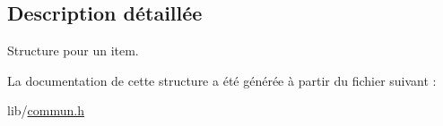 \subsection{Description détaillée}
Structure pour un item. 

La documentation de cette structure a été générée à partir du fichier suivant \+:\begin{DoxyCompactItemize}
\item 
lib/\hyperlink{commun_8h}{commun.\+h}\end{DoxyCompactItemize}
